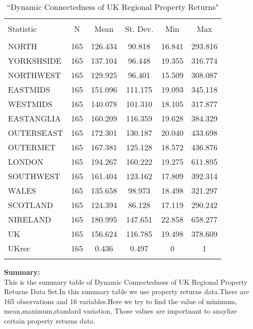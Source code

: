 \documentclass{article}
\begin{document}
\begin{table}[!htbp] \centering 
	\caption{“Dynamic 
		Connectedness of UK Regional Property Returns"} 
	\label{} 
	\begin{tabular}{@{\extracolsep{5pt}}lccccc} 
		\\[-1.8ex]\hline 
		\hline \\[-1.8ex] 
		Statistic & \multicolumn{1}{c}{N} & \multicolumn{1}{c}{Mean} & \multicolumn{1}{c}{St. Dev.} & \multicolumn{1}{c}{Min} & \multicolumn{1}{c}{Max} \\ 
		\hline \\[-1.8ex] 
		NORTH & 165 & 126.434 & 90.818 & 16.841 & 293.816 \\ 
		YORKSHSIDE & 165 & 137.104 & 96.448 & 19.355 & 316.774 \\ 
		NORTHWEST & 165 & 129.925 & 96.401 & 15.509 & 308.087 \\ 
		EASTMIDS & 165 & 151.096 & 111.175 & 19.093 & 345.118 \\ 
		WESTMIDS & 165 & 140.078 & 101.310 & 18.105 & 317.877 \\ 
		EASTANGLIA & 165 & 160.209 & 116.359 & 19.628 & 384.329 \\ 
		OUTERSEAST & 165 & 172.301 & 130.187 & 20.040 & 433.698 \\ 
		OUTERMET & 165 & 167.381 & 125.128 & 18.572 & 436.876 \\ 
		LONDON & 165 & 194.267 & 160.222 & 19.275 & 611.895 \\ 
		SOUTHWEST & 165 & 161.404 & 123.162 & 17.809 & 392.314 \\ 
		WALES & 165 & 135.658 & 98.973 & 18.498 & 321.297 \\ 
		SCOTLAND & 165 & 124.394 & 86.128 & 17.119 & 290.242 \\ 
		NIRELAND & 165 & 180.995 & 147.651 & 22.858 & 658.277 \\ 
		UK & 165 & 156.624 & 116.785 & 19.498 & 378.609 \\ 
		UKrec & 165 & 0.436 & 0.497 & 0 & 1 \\ 
		\hline \\[-1.8ex] 
	\end{tabular} 
\end{table}
 	\large \textbf{Summary:}\\
 
 This is the summary table of Dynamic 
 Connectedness of UK Regional Property Returns Data Set.In this summary table we use property returns data.There are 165 observations
 and 16 variables.Here we try to find the value of minimum, mean,maximum,standard variation,
 Those values are importnant to anaylize certain property returns data.\\
 \vspace{3mm}  
 
 
 
 
\end{document}
